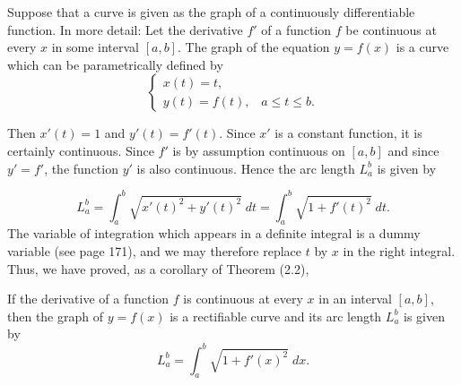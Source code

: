 Suppose that a curve is given as the graph of a continuously differentiable function. In more detail: Let the derivative $f'$ of a function $f$ be continuous at every $x$ in some interval $[a, b]$. The graph of the equation $y = f(x)$ is a curve which can be parametrically defined by
$$
\left \{ \begin{array}{l}
x(t)= t,\\
y(t) = f(t), \;\;\; a \leq t \leq b.
\end{array}
\right .
$$

\noindent Then $x'(t) = 1$ and $y'(t) = f'(t)$. Since $x'$ is a constant function, it is certainly continuous. Since $f'$ is by assumption continuous on $[a, b]$ and since $y' = f'$, the function $y'$ is also continuous. Hence the arc length $L_a^b$ is given by

$$
L_a^b = \int_a^b \sqrt{x'(t)^2 + y'(t)^2} \;dt = \int_a^b \sqrt{1 + f'(t)^2} \;dt . 
$$
\noindent The variable of integration which appears in a definite integral is a dummy variable (see page 171), and we may therefore replace $t$ by $x$ in the right integral. Thus, we have proved, as a corollary of Theorem (2.2),

\begin{theorem} If the derivative of a function $f$ is continuous at every $x$ in an interval $[a, b]$, then the graph of $y = f(x)$ is a rectifiable curve and its arc length $L_a^b$ is given by 
$$
L_a^b = \int_a^b \sqrt{1 + f'(x)^2} \;dx .
$$
\end{theorem}


